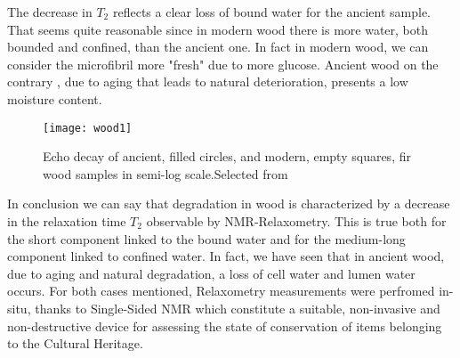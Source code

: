 \documentclass[a4paper,11pt]{report}
\begin{document}
 The decrease in $T_2$ reflects a clear loss of bound water for the ancient sample. That seems quite reasonable since in modern wood there is more water, both bounded and confined, than the ancient one. In fact in modern wood, we can consider the microfibril more "fresh" due to more glucose. Ancient wood on the contrary , due to aging that leads to natural deterioration, presents a low moisture content.
\begin{figure}[ht]
	\centering
	\texttt{[image: wood1]}
	\caption{Echo decay of ancient, filled circles, and modern, empty squares, fir wood samples in semi-log scale.Selected from \cite{quattrowood} }\label{wood1}
\end{figure}

In conclusion we can say that degradation in wood is characterized by a decrease in the relaxation time $T_2$ observable by NMR-Relaxometry. This is true both for the short component linked to the bound water and for the medium-long component linked to confined water. In fact, we have seen that in ancient wood, due to aging and natural degradation, a loss of cell water and lumen water occurs. For both cases mentioned, Relaxometry measurements were perfromed in-situ, thanks to Single-Sided NMR which constitute a suitable, non-invasive and non-destructive device for assessing the state of conservation of items belonging to the Cultural Heritage.
\end{document}
